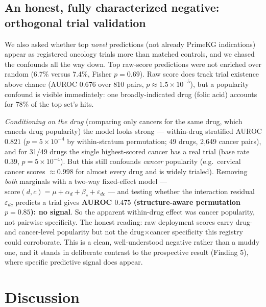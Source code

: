 \documentclass[11pt]{article}
\begin{document}
\subsection{An honest, fully characterized negative: orthogonal trial validation}
\begin{nullbox}
We also asked whether top \emph{novel} predictions (not already PrimeKG indications) appear
as registered oncology trials more than matched controls, and we chased the confounds all
the way down. Top raw-score predictions were not enriched over random (6.7\% versus 7.4\%,
Fisher $p=0.69$). Raw score does track trial existence above chance (AUROC 0.676 over 810
pairs, $p\approx1.5\times10^{-5}$), but a popularity confound is visible immediately: one
broadly-indicated drug (folic acid) accounts for 78\% of the top set's hits.

\emph{Conditioning on the drug} (comparing only cancers for the same drug, which cancels
drug popularity) the model looks strong --- within-drug stratified AUROC $0.821$ ($p=5\times
10^{-4}$ by within-stratum permutation; 49 drugs, 2{,}649 cancer pairs), and for 31/49 drugs
the single highest-scored cancer has a real trial (base rate 0.39, $p=5\times10^{-4}$). But
this still confounds \emph{cancer} popularity (e.g.\ cervical cancer scores $\approx0.998$
for almost every drug and is widely trialed). Removing \emph{both} marginals with a two-way
fixed-effect model --- $\mathrm{score}(d,c)=\mu+\alpha_d+\beta_c+\varepsilon_{dc}$ --- and
testing whether the interaction residual $\varepsilon_{dc}$ predicts a trial gives
\textbf{AUROC $0.475$ (structure-aware permutation $p=0.85$): no signal}. So the apparent
within-drug effect was cancer popularity, not pairwise specificity. The honest reading: raw
deployment scores carry drug- and cancer-level popularity but not the drug$\times$cancer
specificity this registry could corroborate. This is a clean, well-understood negative
rather than a muddy one, and it stands in deliberate contrast to the prospective result
(Finding 5), where specific predictive signal does appear.
\end{nullbox}

\section{Discussion}
\end{document}
